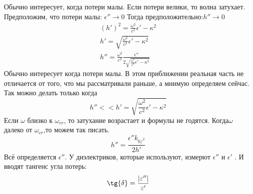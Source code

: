 \begin{enumerate}
	Обычно интересует, когда потери малы. Если потери велики, то волна затухает.
	Предположим, что потери малы: $\epsilon''  \rightarrow 0 $
	Тогда предположительно:$h''  \rightarrow 0 $
	\begin{gather}
		(h')^2 = \frac{\omega^2}{c^2} \epsilon' - \kappa^2\\
		h' = \sqrt{\frac{\omega^2}{c^2} \epsilon' - \kappa^2}\\
		h'' = \frac{\omega^2}{c^2} \frac{\epsilon''}{2 \sqrt{\frac{\omega^2}{c^2} \epsilon' - \kappa^2}}
	\end{gather}
	Обычно интересует когда потери малы.
	В этом приближении реальная часть не отличается от того, что мы рассматривали раньше, а мнимую определяем сейчас.
	Так можно делать только когда
	\begin{equation}
		h'' << h' = \sqrt{\frac{\omega^2}{c^2} \epsilon' - \kappa^2}
	\end{equation}
	Если $\omega$ близко к $\omega_{cr}$, то затухание возрастает и формулы не годятся.
	Когда$\omega$ далеко от $\omega_{cr}$,то можем так писать.
	\begin{equation}
		h'' = \frac{\epsilon'' k_{0/^2}}{2 h'}
	\end{equation}
	Всё определяется $\epsilon''$. У диэлектриков, которые используют, измерют $\epsilon''$ и $\epsilon'$ .
	И вводят тангенс угла потерь:
	\begin{equation}
		\tg{\delta} = \frac{|\varepsilon''|}{\epsilon'}
	\end{equation}


\end{enumerate}
